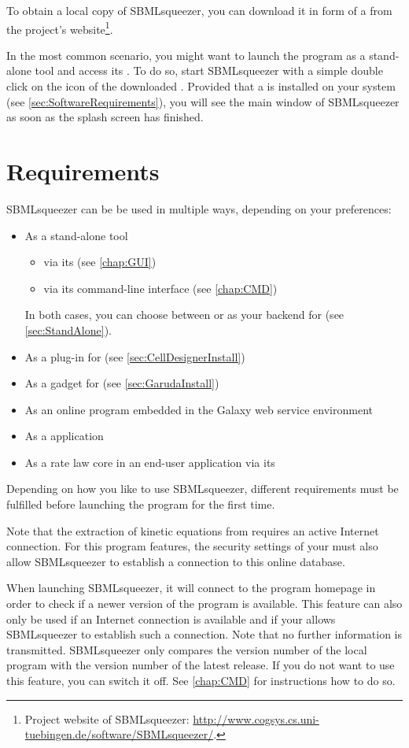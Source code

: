 To obtain a local copy of SBMLsqueezer, you can download it in form of a 
\JAR from the project's website\footnote{Project website of SBMLsqueezer: \url{http://www.cogsys.cs.uni-tuebingen.de/software/SBMLsqueezer/}.}.

In the most common scenario, you might want to launch the program as a
stand-alone tool and access its \GUI. To do so,
start SBMLsqueezer with a simple double click on the icon of the downloaded
\JAR.
Provided that a \JVM is installed on your system 
(see \vref{sec:SoftwareRequirements}), you will see the main window of
SBMLsqueezer as soon as the splash screen has finished.

\section{Requirements}

SBMLsqueezer can be be used in multiple ways, depending on your preferences:
\begin{itemize}
  \item As a stand-alone tool
  \begin{itemize}
    \item via its \GUI (see \vref{chap:GUI})
    \item via its command-line interface (see \vref{chap:CMD})
  \end{itemize}
        In both cases, you can choose between \JSBML or \libSBML as your backend
        for \SBML (see \vref{sec:StandAlone}).
  \item As a plug-in for \CellDesigner (see \vref{sec:CellDesignerInstall})
  \item As a gadget for \Garuda (see \vref{sec:GarudaInstall})
  \item As an online program embedded in the Galaxy web service environment \citet{Goecks2010}
  \item As a \JavaWebStart application
  \item As a rate law core in an end-user application via its \API
\end{itemize}
Depending on how you like to use SBMLsqueezer, different requirements must be
fulfilled before launching the program for the first time.

Note that the extraction of kinetic equations from \SABIO requires an active Internet connection.
For this program features, the security settings of your \OS must also allow SBMLsqueezer to establish a connection to this online database.

When launching SBMLsqueezer, it will connect to the program homepage in order to check if a newer version of the program is available.
This feature can also only be used if an Internet connection is available and if your \OS allows SBMLsqueezer to establish such a connection.
Note that no further information is transmitted.
SBMLsqueezer only compares the version number of the local program with the version number of the latest release.
If you do not want to use this feature, you can switch it off.
See \vref{chap:CMD} for instructions how to do so.

